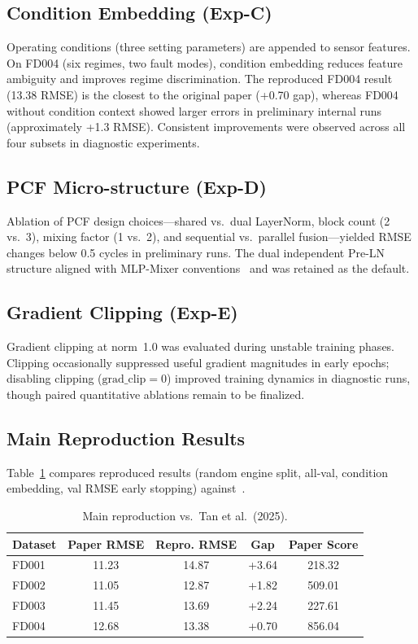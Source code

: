 \documentclass[10pt,twocolumn]{article}
\begin{document}
\subsection{Condition Embedding (Exp-C)}

Operating conditions (three setting parameters) are appended to sensor features.
On FD004 (six regimes, two fault modes), condition embedding reduces feature ambiguity and improves regime discrimination.
The reproduced FD004 result (13.38 RMSE) is the closest to the original paper (+0.70 gap), whereas FD004 without condition context showed larger errors in preliminary internal runs (approximately +1.3 RMSE).
Consistent improvements were observed across all four subsets in diagnostic experiments.

\subsection{PCF Micro-structure (Exp-D)}

Ablation of PCF design choices---shared vs.\ dual LayerNorm, block count (2 vs.\ 3), mixing factor (1 vs.\ 2), and sequential vs.\ parallel fusion---yielded RMSE changes below 0.5 cycles in preliminary runs.
The dual independent Pre-LN structure aligned with MLP-Mixer conventions~\cite{tolstikhin2021} and was retained as the default.

\subsection{Gradient Clipping (Exp-E)}

Gradient clipping at norm~1.0 was evaluated during unstable training phases.
Clipping occasionally suppressed useful gradient magnitudes in early epochs; disabling clipping ($\mathrm{grad\_clip}=0$) improved training dynamics in diagnostic runs, though paired quantitative ablations remain to be finalized.

\subsection{Main Reproduction Results}

Table~\ref{tab:main} compares reproduced results (random engine split, all-val, condition embedding, val RMSE early stopping) against~\cite{tan2025}.

\begin{table}[t]
  \centering
  \caption{Main reproduction vs.\ Tan et al.\ (2025).}
  \label{tab:main}
  \small
  \begin{tabular}{@{}lcccc@{}}
    \toprule
    Dataset & Paper RMSE & Repro. RMSE & Gap & Paper Score \\
    \midrule
    FD001 & 11.23 & 14.87 & +3.64 & 218.32 \\
    FD002 & 11.05 & 12.87 & +1.82 & 509.01 \\
    FD003 & 11.45 & 13.69 & +2.24 & 227.61 \\
    FD004 & 12.68 & 13.38 & +0.70 & 856.04 \\
    \bottomrule
  \end{tabular}
\end{table}
\end{document}
